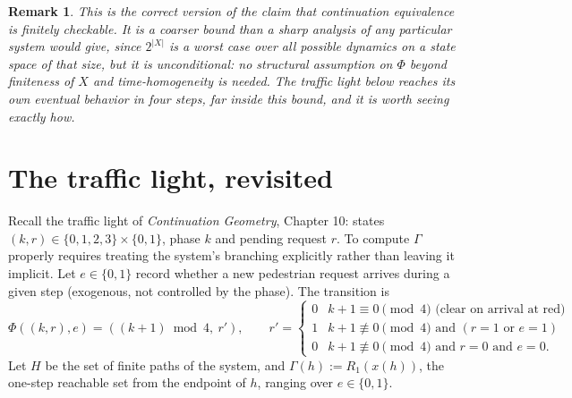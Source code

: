 \documentclass[11pt]{report}
\newtheorem{remark}{Remark}[chapter]
\begin{document}
\begin{remark}
This is the correct version of the claim that continuation
equivalence is finitely checkable. It is a coarser bound than a sharp
analysis of any particular system would give, since $2^{|X|}$ is a
worst case over all possible dynamics on a state space of that size,
but it is unconditional: no structural assumption on $\Phi$ beyond
finiteness of $X$ and time-homogeneity is needed. The traffic light
below reaches its own eventual behavior in four steps, far inside this
bound, and it is worth seeing exactly how.
\end{remark}

\section*{The traffic light, revisited}

Recall the traffic light of \emph{Continuation Geometry}, Chapter 10:
states $(k, r) \in \{0,1,2,3\} \times \{0,1\}$, phase $k$ and pending
request $r$. To compute $\Gamma$ properly requires treating the
system's branching explicitly rather than leaving it implicit. Let
$e \in \{0,1\}$ record whether a new pedestrian request arrives during
a given step (exogenous, not controlled by the phase). The transition
is
\[
\Phi((k,r), e) = \left( (k+1) \bmod 4,\ r' \right), \qquad
r' = \begin{cases}
0 & k+1 \equiv 0 \pmod 4 \text{ (clear on arrival at red)} \\
1 & k+1 \not\equiv 0 \pmod 4 \text{ and } (r = 1 \text{ or } e = 1) \\
0 & k+1 \not\equiv 0 \pmod 4 \text{ and } r = 0 \text{ and } e = 0.
\end{cases}
\]
Let $H$ be the set of finite paths of the system, and
$\Gamma(h) := R_1(x(h))$, the one-step reachable set from the
endpoint of $h$, ranging over $e \in \{0,1\}$.
\end{document}
